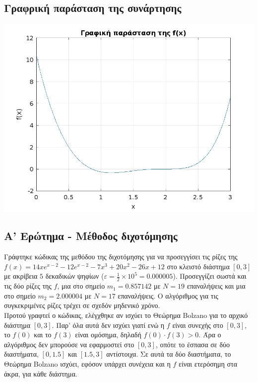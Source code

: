 \documentclass[a4paper, 14pt]{article}   %
\begin{document}
\subsection*{Γραφρική παράσταση της συνάρτησης}  %

\begin{center}   %
	\includegraphics[scale=0.75]{graph1.png}
\end{center}   %

\subsection*{Α' Ερώτημα - Μέθοδος διχοτόμησης}  %

Γράφτηκε κώδικας της μεθόδου της διχοτόμησης για να προσεγγίσει τις ρίζες της \(f(x) = 14xe^{x-2} - 12e^{x-2} - 7x^3 + 20x^2 - 26x + 12\) στο κλειστό διάστημα \([0,3]\) με ακρίβεια $5$ δεκαδικών ψηφίων (\(\varepsilon = \frac{1}{2} \times 10^5 = 0.000005\)). Προσεγγίζει σωστά και τις δύο ρίζες της \(f\), μια στο σημείο \(m_1 = 0.857142\) με \(N = 19\) επαναλήψεις και μια στο σημείο \(m_2 = 2.000004\) με \(N = 17\) επαναλήψεις. Ο αλγόριθμος για τις συγκεκριμένες ρίζες τρέχει σε σχεδόν μηδενικό χρόνο.\\

Προτού γραφτεί ο κώδικας, ελέγχθηκε αν ισχύει το Θεώρημα Bolzano για το αρχικό διάστημα \([0,3]\). Παρ' όλα αυτά δεν ισχύει γιατί ενώ η \(f\) είναι συνεχής στο \([0,3]\), το \(f(0)\) και το \(f(3)\) είναι ομόσημα, δηλαδή \(f(0) \cdot f(3) > 0\). Άρα ο αλγόριθμος δεν μπορούσε να εφαρμοστεί στο \([0,3]\), οπότε το έσπασα σε δύο διαστήματα, \([0,1.5]\) και \([1.5,3]\) αντίστοιχα. Σε αυτά τα δύο διαστήματα, το Θεώρημα Bolzano ισχύει, εφόσον υπάρχει συνέχεια και η \(f\) είναι ετερόσημη στα άκρα, για κάθε διάστημα.\\
\end{document}
